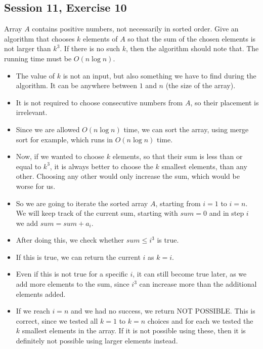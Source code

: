 \subsection {Session 11, Exercise 10}


 Array $A$ contains positive numbers, not necessarily in sorted order. Give an algorithm that chooses $k$ elements of $A$ so that the sum of the chosen elements is not larger than $k^3$. If there is no such $k$, then the algorithm should note that. The running time must be $O(n\log{}n)$.


\begin{itemize}
    \item The value of $k$ is not an input, but also something we have to find during the algorithm. It can be anywhere between $1$ and $n$ (the size of the array).
    \item It is not required to choose consecutive numbers from $A$, so their placement is irrelevant.
    \item Since we are allowed $O(n\log{}n)$ time, we can sort the array, using merge sort for example, which runs in $O(n\log{}n)$ time.
    \item Now, if we wanted to choose $k$ elements, so that their sum is less than or equal to $k^3$, it is always better to choose the $k$ smallest elements, than any other. Choosing any other would only increase the sum, which would be worse for us.
    \item So we are going to iterate the sorted array $A$, starting from $i=1$ to $i=n$. We will keep track of the current sum, starting with $sum = 0$ and in step $i$ we add $sum = sum + a_i$.
    \item After doing this, we check whether $sum \leq{} i^3$ is true.
    \item If this is true, we can return the current $i$ as $k=i$.
    \item Even if this is not true for a specific $i$, it can still become true later, as we add more elements to the sum, since $i^3$ can increase more than the additional elements added.
    \item If we reach $i=n$ and we had no success, we return NOT POSSIBLE. This is correct, since we tested all $k=1$ to $k=n$ choices and for each we tested the $k$ smallest elements in the array. If it is not possible using these, then it is definitely not possible using larger elements instead.
\end{itemize}


